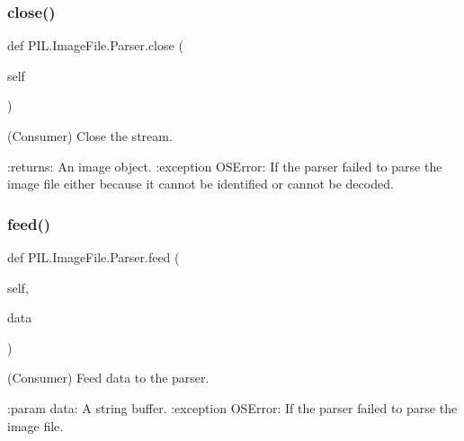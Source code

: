 \mbox{\label{classPIL_1_1ImageFile_1_1Parser_ada4551727462e59682d4864d40f7891a}} 
\subsubsection{\texorpdfstring{close()}{close()}}
{\footnotesize\ttfamily def P\+I\+L.\+Image\+File.\+Parser.\+close (\begin{DoxyParamCaption}\item[{}]{self }\end{DoxyParamCaption})}

\begin{DoxyVerb}(Consumer) Close the stream.

:returns: An image object.
:exception OSError: If the parser failed to parse the image file either
            because it cannot be identified or cannot be
            decoded.
\end{DoxyVerb}
 \mbox{\label{classPIL_1_1ImageFile_1_1Parser_a8a952f7aa1f42012d193c1ec4060122f}} 
\subsubsection{\texorpdfstring{feed()}{feed()}}
{\footnotesize\ttfamily def P\+I\+L.\+Image\+File.\+Parser.\+feed (\begin{DoxyParamCaption}\item[{}]{self,  }\item[{}]{data }\end{DoxyParamCaption})}

\begin{DoxyVerb}(Consumer) Feed data to the parser.

:param data: A string buffer.
:exception OSError: If the parser failed to parse the image file.
\end{DoxyVerb}
 \mbox{\label{classPIL_1_1ImageFile_1_1Parser_abc12bc5d87351871fb433ad3e559ae0f}} 
